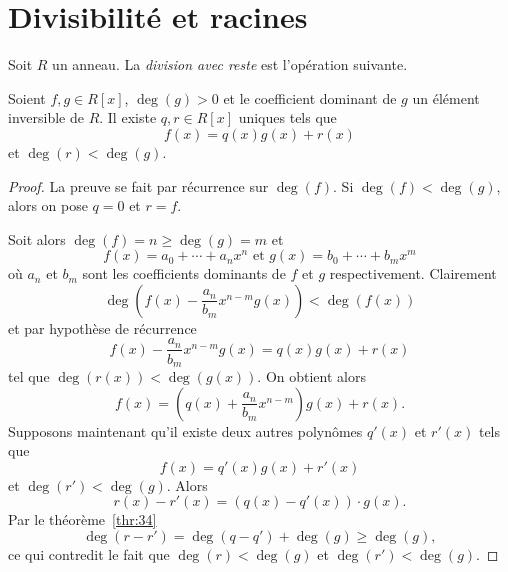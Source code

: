 \section{Divisibilité et racines} 
\label{sec:divisibilite}
Soit $R$ un anneau. La \emph{division avec reste} est l'opération suivante. 

\begin{theorem}
  \label{thr:33}
  Soient $f,g \in R[x]$, $\deg(g) >0$ et le coefficient dominant de $g$ un élément  inversible de $R$.   Il existe $q,r \in R[x]$ uniques tels que 
  \begin{displaymath}
    f(x) = q(x) g(x) + r(x) 
  \end{displaymath}
  et $\deg(r) < \deg(g)$. 
\end{theorem}


\begin{proof}
  La preuve se fait par récurrence sur $\deg(f)$. Si $\deg(f) < \deg(g)$, alors on pose $q = 0$ et $r = f$.

Soit alors $\deg(f) = n \geq \deg(g)=m$ et 
\begin{displaymath}
  f(x) = a_0+ \cdots +a_n x^n \text{ et } g(x) = b_0 + \cdots + b_m x^m 
\end{displaymath}
où $a_n$ et $b_m$ sont les coefficients dominants de $f$ et $g$ respectivement. 
Clairement 
\begin{displaymath}
  \deg\left( f(x) - \frac{a_n}{ b_m } x^{n-m} g(x) \right) < \deg(f(x))
\end{displaymath}
et par hypothèse de récurrence 
\begin{displaymath}
  f(x) - \frac{a_n}{ b_m } x^{n-m} g(x)  = q(x) g(x) + r(x) 
\end{displaymath}
tel que $\deg(r(x)) < \deg(g(x))$. On  obtient alors
\begin{displaymath}
  f(x) = \left(q(x) + \frac{a_n}{ b_m } x^{n-m} \right) g(x) + r(x). 
\end{displaymath}
%
Supposons maintenant qu'il existe deux autres polynômes $q'(x)$ et $r'(x)$ tels que 
\begin{displaymath}
    f(x) = q'(x) g(x) + r'(x) 
  \end{displaymath}
  et $\deg(r') < \deg(g)$. 
Alors 
\begin{displaymath}
   r(x) - r'(x) = (q(x) - q'(x)) ⋅ g(x). 
\end{displaymath}
Par le théorème~\ref{thr:34}
\begin{displaymath}
 \deg( r - r')  = \deg(q - q') + \deg(g) \geq \deg(g), 
\end{displaymath}
ce qui contredit le fait que $\deg(r) < \deg(g)$ et $\deg(r') < \deg(g)$. 
\end{proof}



